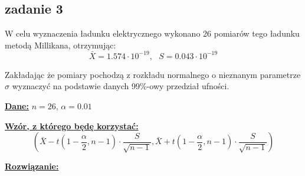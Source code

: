 \subsection{zadanie 3}
W celu wyznaczenia ładunku elektrycznego wykonano 26 pomiarów tego ładunku metodą Millikana, otrzymując:
$$
\bar X = 1.574\cdot10^{-19}, \mbox{ } S = 0.043 \cdot 10^{-19}
$$

Zakładając że pomiary pochodzą z rozkładu normalnego o nieznanym parametrze $\sigma$ wyznaczyć na podstawie danych 99\%-owy przedział ufności. 
\newline

\textbf{\underline{Dane:}} $n = 26$, $\alpha = 0.01$
\newline

\textbf{\underline{Wzór, z którego będę korzystać:}}
$$
\left(
\bar X - t \left(1-\frac{\alpha}{2},n-1 \right) \cdot \frac{S}{\sqrt{n-1}},
\bar X + t \left(1-\frac{\alpha}{2},n-1 \right) \cdot \frac{S}{\sqrt{n-1}}
\right)
$$


\textbf{\underline{Rozwiązanie:}}

